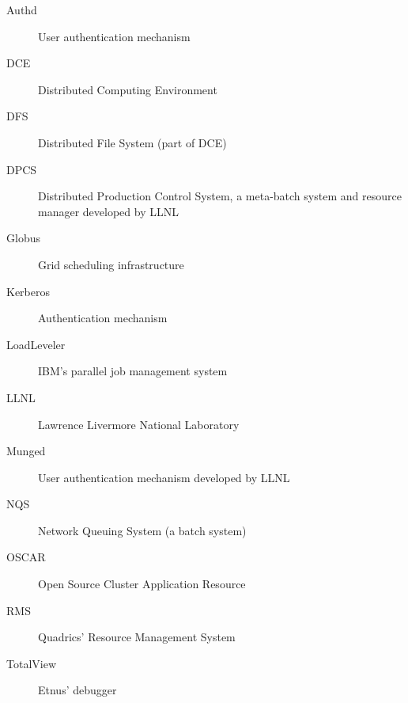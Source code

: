 \begin{description}
\item[Authd]    User authentication mechanism
\item[DCE]	Distributed Computing Environment
\item[DFS]	Distributed File System (part of DCE)
\item[DPCS]	Distributed Production Control System, a meta-batch system 
		and resource manager developed by LLNL
\item[Globus]	Grid scheduling infrastructure
\item[Kerberos]	Authentication mechanism
\item[LoadLeveler] IBM's parallel job management system
\item[LLNL]	Lawrence Livermore National Laboratory
\item[Munged]   User authentication mechanism developed by LLNL
\item[NQS]	Network Queuing System (a batch system)
\item[OSCAR]	Open Source Cluster Application Resource
\item[RMS]	Quadrics' Resource Management System
\item[TotalView] Etnus' debugger
\end{description}

\newpage


